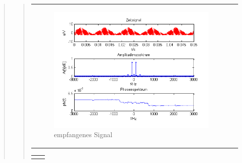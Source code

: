 \begin{quote}
\begin{quote}
\begin{center}
\begin{tabular}{ll}
            \begin{minipage}{0.67\textwidth}
                \begin{figure}[H]
                    \label{fig:DemodreieckoT2}
                    \includegraphics[scale=0.7]{Bilder/Demo_Dre_2k_100Hz_mo_ohneTiefpass}
                    \caption{empfangenes Signal}
                \end{figure}
        
            \end{minipage}
        
        \end{tabular}
        \end{center}
        
         \begin{center}
        \begin{tabular}{ll}
        
        \hspace{-5cm}
            \begin{minipage}{0.67\textwidth}
                

\end{minipage}
\end{tabular}
\end{center}
\end{quote}
\end{quote}
